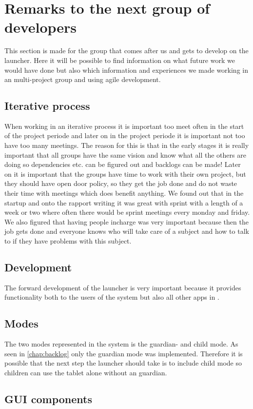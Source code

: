 \section{Remarks to the next group of developers}
\label{epi:remarks}
This section is made for the group that comes after us and gets to develop on the launcher. Here it will be possible to find information on what future work we would have done but also which information and experiences we made working in an multi-project group and using agile development.

\subsection{Iterative process}
\label{epi:iterative_process}

When working in an iterative process it is important too meet often in the start of the project periode and later on in the project periode it is important not too have too many meetings. The reason for this is that in the early stages it is really important that all groups have the same vision and know what all the others are doing so dependencies etc. can be figured out and backlogs can be made! Later on it is important that the groups have time to work with their own project, but they should have open door policy, so they get the job done and do not waste their time with meetings which does benefit anything.
We found out that in the startup and onto the rapport writing it was great with sprint with a length of a week or two where often there would be sprint meetings every monday and friday.
We also figured that having people incharge was very important because then the job gets done and everyone knows who will take care of a subject and how to talk to if they have problems with this subject.


\subsection{Development}
\label{epi:development}

The forward development of the launcher is very important because it provides functionality both to the users of the \giraf[] system but also all other apps in \giraf[].

\subsection{Modes}
\label{epi:modes}
The two modes represented in the \giraf[] system is the guardian- and child mode. As seen in \autoref{chap:backlog} only the guardian mode was implemented. Therefore it is possible that the next step the launcher should take is to include child mode so children can use the tablet alone without an guardian.

\subsection{\giraf[] GUI components}
\label{epi:giraf_GUI_components}

